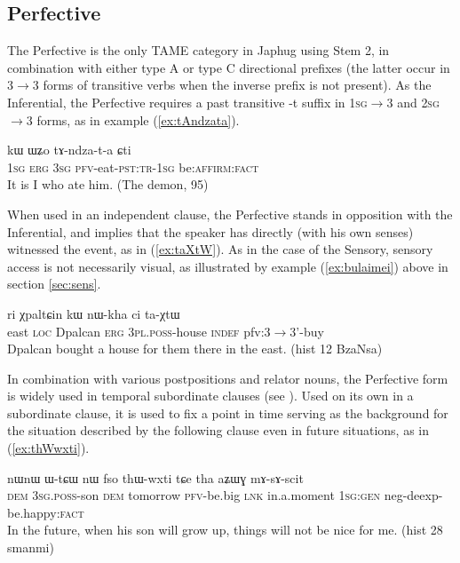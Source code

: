 \documentclass[oldfontcommands,oneside,a4paper,11pt]{article}
\newcommand{\ipa}[1]{{\phon \mbox{#1}}} %
\newcommand{\refb}[1]{(\ref{#1})}
\newcommand{\factual}[1]{\textsc{:fact}}
\begin{document}
\subsection{Perfective}  \label{sec:pfv}
The Perfective is the only TAME category in Japhug using Stem 2, in combination with either type A or type C directional prefixes (the latter occur in 3$\rightarrow$3 forms of transitive verbs when the inverse prefix is not present). As the Inferential, the Perfective requires a past transitive \ipa{-t} suffix in  \textsc{1sg}$\rightarrow$3 and \textsc{2sg}$\rightarrow$3 forms, as in example \refb{ex:tAndzata}.

\begin{exe}
\ex \label{ex:tAndzata}
\gll \ipa{aʑo} 	\ipa{kɯ} 	\ipa{ɯʑo} 	\ipa{tɤ-ndza-t-a} 	\ipa{ɕti} \\
\textsc{1sg} \textsc{erg} \textsc{3sg} \textsc{pfv}-eat-\textsc{pst:tr-1sg} be:\textsc{affirm:fact} \\
\glt It is I who ate him. (The demon, 95)
\end{exe}

When used in an independent clause,  the Perfective stands in opposition with the Inferential, and implies that the speaker has directly (with his own senses) witnessed the event, as in  \refb{ex:taXtW}. As in the case of the Sensory, sensory access is not necessarily visual, as illustrated by example \refb{ex:bulaimei} above in section \ref{sec:sens}.

\begin{exe}
\ex \label{ex:taXtW}
\gll \ipa{akɯ} 	\ipa{ri} 	\ipa{χpaltɕin} 	\ipa{kɯ} 	\ipa{nɯ-kha} 	\ipa{ci} 	\ipa{ta-χtɯ} \\
east \textsc{loc} Dpalcan \textsc{erg} \textsc{3pl.poss}-house \textsc{indef} pfv:3$\rightarrow$3'-buy \\
\glt Dpalcan bought a house for them there in the east. (hist 12 BzaNsa)
\end{exe}

In combination with various postpositions and relator nouns, the Perfective form is widely used in temporal subordinate clauses (see \citealt[284-93]{jacques14linking}). Used on its own in a subordinate clause, it is used to fix a point in time serving as the background for the situation described by the following clause even in future situations, as in \refb{ex:thWwxti}.

\begin{exe}
\ex \label{ex:thWwxti}
\gll 
\ipa{nɯnɯ} 	\ipa{ɯ-tɕɯ} 	\ipa{nɯ} 	\ipa{fso} 	\ipa{thɯ-wxti} 	\ipa{tɕe} 	\ipa{tha} 	\ipa{aʑɯɣ} 	\ipa{mɤ-sɤ-scit}  \\
\textsc{dem} \textsc{3sg.poss}-son \textsc{dem} tomorrow \textsc{pfv}-be.big \textsc{lnk} in.a.moment \textsc{1sg:gen} neg-deexp-be.happy\factual{} \\
\glt In the future, when his son will grow up, things will not be nice for me. (hist 28 smanmi)
\end{exe}
\end{document}
